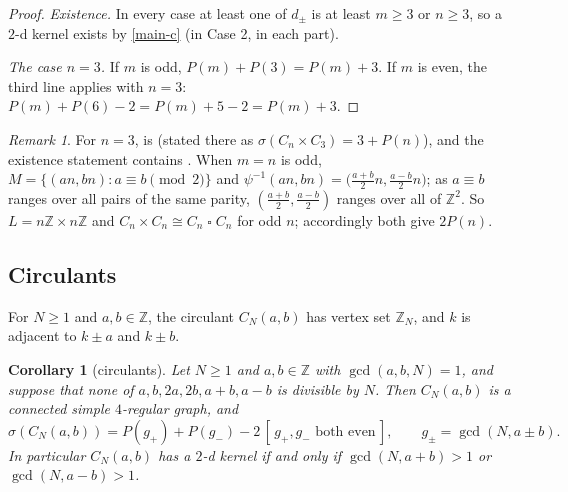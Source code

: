 \documentclass[11pt]{article}
\theoremstyle{plain}
\newtheorem{corollary}[corollary]{Corollary}
\theoremstyle{definition}
\theoremstyle{remark}
\newtheorem{remark}[remark]{Remark}
\newcommand{\Z}{\mathbb{Z}}
\newcommand{\T}{\mathbin{\square}}
\newcommand{\Per}{P}
\newcommand{\Iv}[1]{[\,#1\,]}
\begin{document}
\begin{proof}
\emph{Existence.} In every case at least one of $d_\pm$ is at least $m \ge 3$ or $n \ge 3$,
so a $2$-d kernel exists by \ref{main-c} (in Case 2, in each part).

\emph{The case $n = 3$.} If $m$ is odd, $\Per(m) + \Per(3) = \Per(m) + 3$. If $m$ is even,
the third line applies with $n = 3$: $\Per(m) + \Per(6) - 2 = \Per(m) + 5 - 2 = \Per(m) + 3$.
\end{proof}

\begin{remark}
For $n = 3$,  is \cite[Theorem~9(i)]{Bednarz2021} (stated there as
$\sigma(C_n \times C_3) = 3 + \Per(n)$), and the existence statement contains
\cite[Theorem~6(ii)]{Bednarz2021}. When $m = n$ is odd, $M = \{(an, bn) : a \equiv b \pmod 2\}$
and $\psi^{-1}(an, bn) = \bigl(\tfrac{a+b}{2}n, \tfrac{a-b}{2}n\bigr)$; as $a \equiv b$ ranges
over all pairs of the same parity, $(\tfrac{a+b}{2}, \tfrac{a-b}{2})$ ranges over all of
$\Z^2$. So $L = n\Z \times n\Z$ and $C_n \times C_n \cong C_n \T C_n$ for odd $n$; accordingly
 both give $2\Per(n)$.
\end{remark}

\subsection{Circulants}

For $N \ge 1$ and $a, b \in \Z$, the circulant $C_N(a,b)$ has vertex set $\Z_N$, and $k$ is
adjacent to $k \pm a$ and $k \pm b$.

\begin{corollary}[circulants]\label{cor:circulant}
Let $N \ge 1$ and $a, b \in \Z$ with $\gcd(a, b, N) = 1$, and suppose that none of
$a, b, 2a, 2b, a + b, a - b$ is divisible by $N$. Then $C_N(a,b)$ is a connected simple
$4$-regular graph, and
\[
\sigma(C_N(a,b)) = \Per(g_{+}) + \Per(g_{-}) - 2\,\Iv{g_{+}, g_{-} \text{ both even}},
\qquad g_{\pm} = \gcd(N, a \pm b) .
\]
In particular $C_N(a,b)$ has a $2$-d kernel if and only if $\gcd(N, a+b) > 1$ or
$\gcd(N, a-b) > 1$.
\end{corollary}
\end{document}
